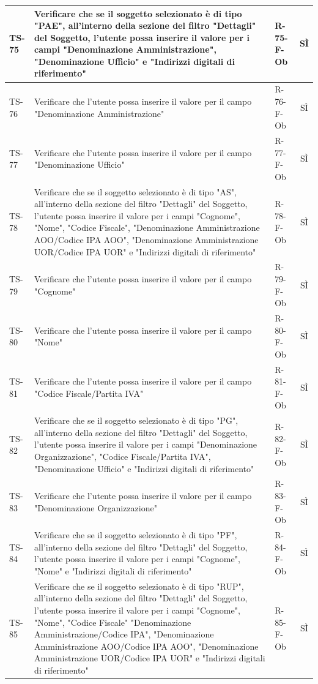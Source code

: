 \documentclass[a4paper,12pt]{article}
\begin{document}
\begin{longtable}{|p{1.5cm}|p{8.3cm}|p{2.4cm}|c|}
\hline
TS-75 & Verificare che se il soggetto selezionato è di tipo "PAE", all'interno della sezione del filtro "Dettagli" del Soggetto, l'utente possa inserire il valore per i campi "Denominazione Amministrazione", "Denominazione Ufficio" e "Indirizzi digitali di riferimento" & R-75-F-Ob & SÌ \\
\hline
TS-76 & Verificare che l'utente possa inserire il valore per il campo "Denominazione Amministrazione" & R-76-F-Ob & SÌ \\
\hline
TS-77 & Verificare che l'utente possa inserire il valore per il campo "Denominazione Ufficio" & R-77-F-Ob & SÌ \\
\hline
TS-78 & Verificare che se il soggetto selezionato è di tipo "AS", all'interno della sezione del filtro "Dettagli" del Soggetto, l'utente possa inserire il valore per i campi "Cognome", "Nome", "Codice Fiscale", "Denominazione Amministrazione AOO/Codice IPA AOO", "Denominazione Amministrazione UOR/Codice IPA UOR" e "Indirizzi digitali di riferimento" & R-78-F-Ob & SÌ \\
\hline
TS-79 & Verificare che l'utente possa inserire il valore per il campo "Cognome" & R-79-F-Ob & SÌ \\
\hline
TS-80 & Verificare che l'utente possa inserire il valore per il campo "Nome" & R-80-F-Ob & SÌ \\
\hline
TS-81 & Verificare che l'utente possa inserire il valore per il campo "Codice Fiscale/Partita IVA" & R-81-F-Ob & SÌ \\
\hline
TS-82 & Verificare che se il soggetto selezionato è di tipo "PG", all'interno della sezione del filtro "Dettagli" del Soggetto, l'utente possa inserire il valore per i campi "Denominazione Organizzazione", "Codice Fiscale/Partita IVA", "Denominazione Ufficio" e "Indirizzi digitali di riferimento" & R-82-F-Ob & SÌ \\
\hline
TS-83 & Verificare che l'utente possa inserire il valore per il campo "Denominazione Organizzazione" & R-83-F-Ob & SÌ \\
\hline
TS-84 & Verificare che se il soggetto selezionato è di tipo "PF", all'interno della sezione del filtro "Dettagli" del Soggetto, l'utente possa inserire il valore per i campi "Cognome", "Nome" e "Indirizzi digitali di riferimento" & R-84-F-Ob & SÌ \\
\hline
TS-85 & Verificare che se il soggetto selezionato è di tipo "RUP", all'interno della sezione del filtro "Dettagli" del Soggetto, l'utente possa inserire il valore per i campi "Cognome", "Nome", "Codice Fiscale" "Denominazione Amministrazione/Codice IPA", "Denominazione Amministrazione AOO/Codice IPA AOO", "Denominazione Amministrazione UOR/Codice IPA UOR" e "Indirizzi digitali di riferimento" & R-85-F-Ob & SÌ \\

\end{longtable}
\end{document}
